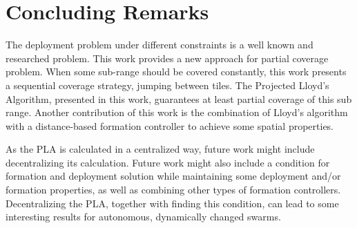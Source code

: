 \documentclass{iacas}
\begin{document}

\section{Concluding Remarks}
The deployment problem under different constraints is a well known and researched problem. This work provides a new approach for partial coverage problem. When some sub-range should be covered constantly, this work presents a sequential coverage strategy, jumping between tiles. The Projected Lloyd's Algorithm, presented in this work, guarantees at least partial coverage of this sub range. Another contribution of this work is the combination of Lloyd's algorithm with a distance-based formation controller to achieve some spatial properties.

As the PLA is calculated in a centralized way, future work might include decentralizing its calculation. Future work might also include a condition for formation and deployment solution while maintaining some deployment and/or formation properties, as well as combining other types of formation controllers. Decentralizing the PLA, together with finding this condition, can lead to some interesting results for autonomous, dynamically changed swarms.



\end{document}

